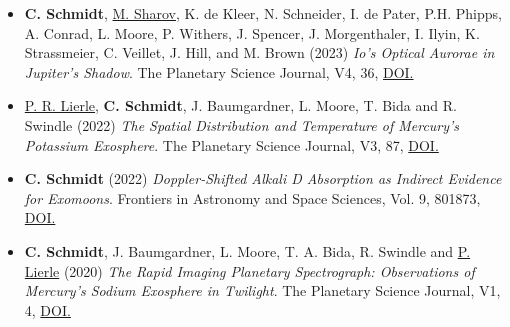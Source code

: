 \documentclass[12pt]{report}
\begin{document}
\begin{itemize}
  \item \textbf{C. Schmidt}, \underline{M. Sharov}, K. de Kleer, N. Schneider, I. de Pater, P.H. Phipps, A. Conrad, L. Moore, P. Withers, J. Spencer, J. Morgenthaler, I. Ilyin, K. Strassmeier, C. Veillet, J. Hill, and M. Brown (2023) \textit{Io’s Optical Aurorae in Jupiter’s Shadow}. The Planetary Science Journal, V4, 36, \href{https://doi.org/10.3847/PSJ/ac85b0}{DOI.} 
  \item \underline{P. R. Lierle}, \textbf{C. Schmidt}, J. Baumgardner, L. Moore, T. Bida and R. Swindle (2022) \textit{The Spatial Distribution and Temperature of Mercury’s Potassium Exosphere}. The Planetary Science Journal, V3, 87, \href{https://doi.org/10.3847/PSJ/ac5c4d}{DOI.} 
  \item \textbf{C. Schmidt} (2022) \textit{Doppler-Shifted Alkali D Absorption as Indirect Evidence for Exomoons}. Frontiers in Astronomy and Space Sciences, Vol. 9, 801873, \href{https://doi.org/10.3389/fspas.2022.801873}{DOI.}
  \item \textbf{C. Schmidt}, J. Baumgardner, L. Moore, T. A. Bida, R. Swindle and \underline{P. Lierle} (2020) \textit{The Rapid Imaging Planetary Spectrograph: Observations of Mercury's Sodium Exosphere in Twilight}. The Planetary Science Journal, V1, 4, \href{https://doi.org/10.3847/PSJ/ab76c9}{DOI.}

\end{itemize}
\end{document}
